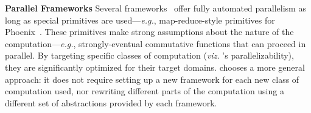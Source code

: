 \documentclass[letterpaper,twocolumn,10pt]{article}
\newcommand{\eg}{{\em e.g.}, }
\newcommand{\heading}[1]{\vspace{4pt}\noindent\textbf{#1}\enspace}
\newcommand{\kk}[1]{[{\color{magenta}kk: #1}]}
\begin{document}
\heading{Parallel Frameworks}
Several frameworks~\cite{streamit:02, brook:04, phoenix:11, raftlib:17} offer fully automated parallelism as long as special primitives are used---\eg map-reduce-style primitives for Phoenix~\cite{phoenix:11}.
These primitives make strong assumptions about the nature of the computation---\eg strongly-eventual commutative functions that can proceed in parallel.
By targeting specific classes of computation (\emph{viz.} \sys's parallelizability), they are significantly optimized for their target domains.
\sys chooses a more general approach:
   it does not require setting up a new framework for each new class of computation used, nor rewriting different parts of the computation using a different set of abstractions provided by each framework.


% 
% 
\end{document}
